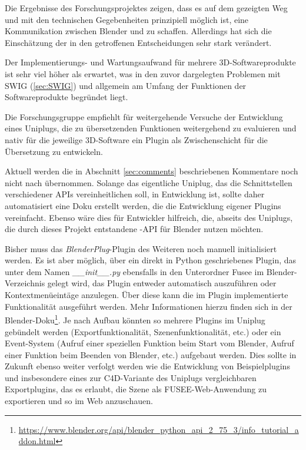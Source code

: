 
Die Ergebnisse des Forschungsprojektes zeigen, dass es auf dem gezeigten Weg und mit den technischen Gegebenheiten prinzipiell möglich ist, eine Kommunikation zwischen Blender und \CS zu schaffen. Allerdings hat sich die Einschätzung der in den  getroffenen Entscheidungen sehr stark verändert.

Der Implementierungs- und Wartungsaufwand für mehrere 3D-Software\-produkte ist sehr viel höher als erwartet, was in den zuvor dargelegten Problemen mit SWIG (\ref{sec:SWIG}) und allgemein am Umfang der Funktionen der Softwareprodukte begründet liegt.

Die Forschungsgruppe empfiehlt für weitergehende Versuche der Entwicklung eines Uniplugs, die zu übersetzenden Funktionen weitergehend zu evaluieren und nativ für die jeweilige 3D-Software ein Plugin als Zwischenschicht für die Übersetzung zu entwickeln.




Aktuell werden die in Abschnitt \ref{sec:comments} beschriebenen Kommentare noch nicht nach \CS übernommen. Solange das eigentliche Uniplug, das die Schnittstellen verschiedener APIs vereinheitlichen soll, in Entwicklung ist, sollte daher automatisiert eine Doku erstellt werden, die die Entwicklung eigener Plugins vereinfacht. Ebenso wäre dies für Entwickler hilfreich, die, abseits des Uniplugs, die durch dieses Projekt entstandene \CC-API für Blender nutzen möchten.

Bisher muss das \emph{BlenderPlug}-Plugin des Weiteren noch manuell initialisiert werden. Es ist aber möglich, über ein direkt in Python geschriebenes Plugin, das unter dem Namen \emph{\_\_init\_\_.py} ebensfalls in den Unterordner Fusee im Blender-Verzeichnis gelegt wird, das Plugin entweder automatisch auszuführen oder Kontextmenüeintäge anzulegen. Über diese kann die im Plugin implementierte Funktionalität ausgeführt werden. Mehr Informationen hierzu finden sich in der Blender-Doku\footnote{\url{https://www.blender.org/api/blender_python_api_2_75_3/info_tutorial_addon.html}}. Je nach Aufbau könnten so mehrere Plugins im Uniplug gebündelt werden (Exportfunktionalität, Szenenfunktionalität, etc.) oder ein Event-System (Aufruf einer speziellen Funktion beim Start vom Blender, Aufruf einer Funktion beim Beenden von Blender, etc.) aufgebaut werden. Dies sollte in Zukunft ebenso weiter verfolgt werden wie die Entwicklung von Beispielplugins und insbesondere eines zur C4D-Variante des Uniplugs vergleichbaren Exportplugins, das es erlaubt, die Szene als FUSEE-Web-Anwendung zu exportieren und so im Web anzuschauen.

